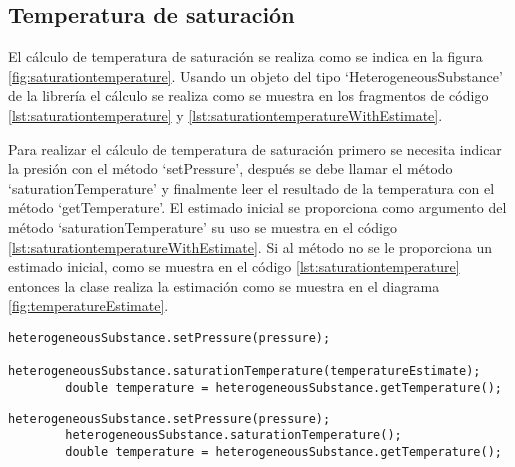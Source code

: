 \subsection{Temperatura de saturación}\label{subsec:saturationtemperature}

	El cálculo de temperatura de saturación se realiza como se indica en la figura \ref{fig:saturationtemperature}. Usando un objeto del tipo `HeterogeneousSubstance' de la librería \Materia el cálculo se realiza como se muestra en los fragmentos de código \ref{lst:saturationtemperature} y \ref{lst:saturationtemperatureWithEstimate}.

	Para realizar el cálculo de temperatura de saturación primero se necesita indicar la presión con el método `setPressure', después se debe llamar el método `saturationTemperature' y finalmente leer el resultado de la temperatura con el método `getTemperature'. El estimado inicial se proporciona como argumento del método `saturationTemperature' su uso se muestra en el código \ref{lst:saturationtemperatureWithEstimate}. Si al método no se le proporciona un estimado inicial, como se muestra en el código \ref{lst:saturationtemperature} entonces la clase realiza la estimación como se muestra en el diagrama \ref{fig:temperatureEstimate}. 

	\begin{lstlisting}[label={lst:saturationtemperatureWithEstimate},caption={Cálculo de la temperatura de saturación proporcionando un estimado inicial.}]
		heterogeneousSubstance.setPressure(pressure);
		heterogeneousSubstance.saturationTemperature(temperatureEstimate);
		double temperature = heterogeneousSubstance.getTemperature();
	\end{lstlisting}


	\begin{lstlisting}[label={lst:saturationtemperature},caption={Cálculo de la temperatura de saturación.}]
		heterogeneousSubstance.setPressure(pressure);
		heterogeneousSubstance.saturationTemperature();
		double temperature = heterogeneousSubstance.getTemperature();
	\end{lstlisting}

	

